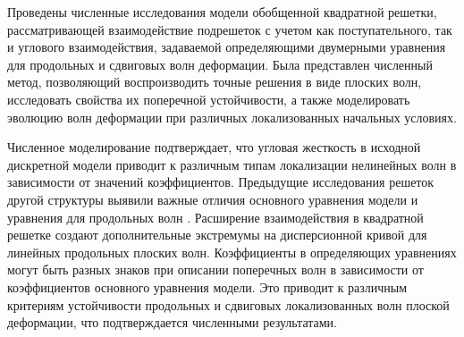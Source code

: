 Проведены численные исследования модели обобщенной квадратной решетки, рассматривающей взаимодействие подрешеток с учетом как поступательного, так и углового взаимодействия, задаваемой определяющими двумерными уравнения для продольных и сдвиговых волн деформации. Была представлен численный метод, позволяющий воспроизводить точные решения в виде плоских волн, исследовать свойства их поперечной устойчивости, а также моделировать эволюцию волн деформации при различных локализованных начальных условиях.

Численное моделирование подтверждает, что угловая жесткость в исходной дискретной модели приводит к различным типам локализации нелинейных волн в зависимости от значений коэффициентов. Предыдущие исследования решеток другой структуры выявили важные отличия основного уравнения модели и уравнения для продольных волн \cite{porkros}.
Расширение взаимодействия в квадратной решетке создают дополнительные экстремумы на дисперсионной кривой для линейных продольных плоских волн. 
Коэффициенты в определяющих уравнениях могут быть разных знаков при описании поперечных волн в зависимости от коэффициентов основного уравнения модели. Это приводит к различным критериям устойчивости продольных и сдвиговых локализованных волн плоской деформации, что подтверждается численными результатами.

